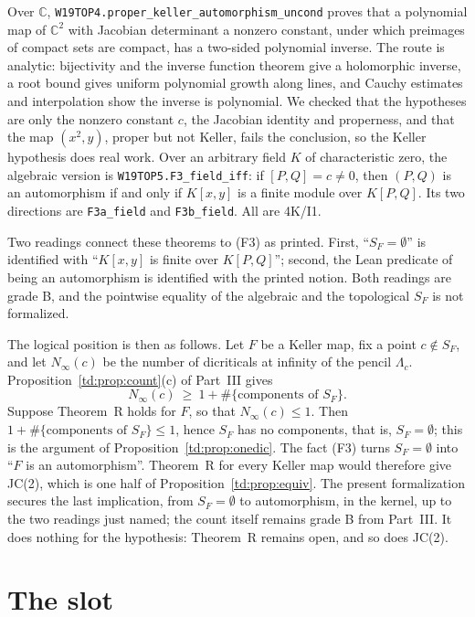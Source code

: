 \documentclass[a4paper,11pt]{article}
\theoremstyle{jsplain}
\theoremstyle{jsdef}
\theoremstyle{jsrem}
\begin{document}
Over $\mathbb C$, \texttt{W19TOP4.\allowbreak{}proper\_\allowbreak{}keller\_\allowbreak{}automorphism\_\allowbreak{}uncond} proves that a polynomial map of $\mathbb C^2$ with Jacobian determinant a nonzero constant, under which preimages of compact sets are compact, has a two-sided polynomial inverse. The route is analytic: bijectivity and the inverse function theorem give a holomorphic inverse, a root bound gives uniform polynomial growth along lines, and Cauchy estimates and interpolation show the inverse is polynomial. We checked that the hypotheses are only the nonzero constant $c$, the Jacobian identity and properness, and that the map $(x^2,y)$, proper but not Keller, fails the conclusion, so the Keller hypothesis does real work. Over an arbitrary field $K$ of characteristic zero, the algebraic version is \texttt{W19TOP5.\allowbreak{}F3\_\allowbreak{}field\_\allowbreak{}iff}: if $[P,Q]=c\ne0$, then $(P,Q)$ is an automorphism if and only if $K[x,y]$ is a finite module over $K[P,Q]$. Its two directions are \texttt{F3a\_\allowbreak{}field} and \texttt{F3b\_\allowbreak{}field}. All are 4K/I1.

Two readings connect these theorems to (F3) as printed. First, ``$S_F=\emptyset$'' is identified with ``$K[x,y]$ is finite over $K[P,Q]$''; second, the Lean predicate of being an automorphism is identified with the printed notion. Both readings are grade B, and the pointwise equality of the algebraic and the topological $S_F$ is not formalized.

The logical position is then as follows. Let $F$ be a Keller map, fix a point $c\notin S_F$, and let $N_\infty(c)$ be the number of dicriticals at infinity of the pencil $\Lambda_c$. Proposition~\ref{td:prop:count}(c) of Part~III gives
$$N_\infty(c)\ \ge\ 1+\#\{\text{components of }S_F\}.$$
Suppose Theorem~R holds for $F$, so that $N_\infty(c)\le1$. Then $1+\#\{\text{components of }S_F\}\le1$, hence $S_F$ has no components, that is, $S_F=\emptyset$; this is the argument of Proposition~\ref{td:prop:onedic}. The fact (F3) turns $S_F=\emptyset$ into ``$F$ is an automorphism''. Theorem~R for every Keller map would therefore give JC(2), which is one half of Proposition~\ref{td:prop:equiv}. The present formalization secures the last implication, from $S_F=\emptyset$ to automorphism, in the kernel, up to the two readings just named; the count itself remains grade B from Part~III. It does nothing for the hypothesis: Theorem~R remains open, and so does JC(2).

\section{The slot}\label{rp:sec:slot}
\end{document}
